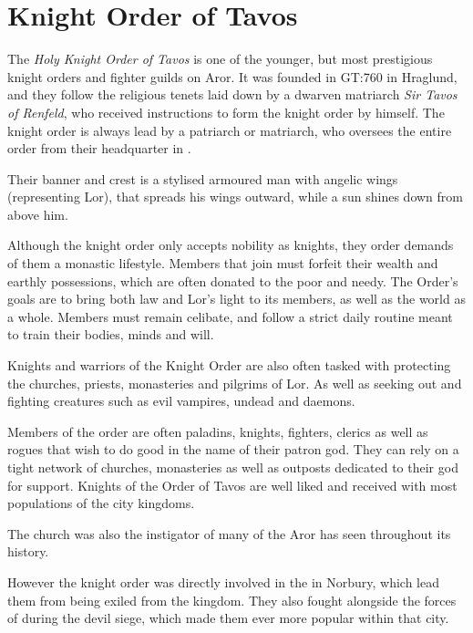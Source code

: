 \section{Knight Order of Tavos}
\label{sec:Knight Order of Tavos}

The \emph{Holy Knight Order of Tavos} is one of the younger, but most
prestigious knight orders and fighter guilds on Aror. It was founded in GT:760
in Hraglund, and they follow the religious tenets laid down by a dwarven
matriarch \emph{Sir Tavos of Renfeld}, who received instructions to form the
knight order by  himself. The knight order is always lead by
a patriarch or matriarch, who oversees the entire order from their headquarter
in .

Their banner and crest is a stylised armoured man with angelic wings
(representing Lor), that spreads his wings outward, while a sun shines down
from above him.

Although the knight order only accepts nobility as knights, they order demands
of them a monastic lifestyle. Members that join must forfeit their wealth and
earthly possessions, which are often donated to the poor and needy. The
Order's goals are to bring both law and Lor's light to its members, as well as
the world as a whole. Members must remain celibate, and follow a strict daily
routine meant to train their bodies, minds and will.

Knights and warriors of the Knight Order are also often tasked with protecting
the churches, priests, monasteries and pilgrims of Lor. As well as seeking out
and fighting creatures such as evil vampires, undead and daemons.

Members of the order are often paladins, knights, fighters, clerics as well as
rogues that wish to do good in the name of their patron god.  They can rely on
a tight network of churches, monasteries as well as outposts dedicated to
their god for support. Knights of the Order of Tavos are well liked and
received with most populations of the city kingdoms.

The church was also the instigator of many of the  Aror
has seen throughout its history.

However the knight order was directly involved in the  in Norbury, which lead them from being exiled from the
kingdom. They also fought alongside the forces of  during
the devil siege, which made them ever more popular within that city.

